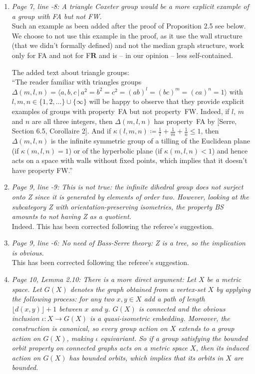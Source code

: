 \documentclass[english,a4paper]{article}
\newcommand*{\FB}{FB\textsubscript{r}}
\newcommand*{\FW}{FW}
\newcommand*{\FA}{FA}
\newcommand*{\FR}{F\textbf{R}}
\begin{document}
\begin{enumerate}
Also added as a discussion after the proof:\\
``In view of Proposition~2.5, two questions remain open: is the implication $[\textnormal{Bergman's property}\implies\textnormal{\FB}]$ strict, and does property~\FW{} implies property~\FR?''
%
\item\textit{Page 7, line -8: A triangle Coxeter group would be a more explicit example of a group with FA but not FW.}\\
Such an example as been added after the proof of Proposition 2.5 see below. We choose to not use this example in the proof, as it use the wall structure (that we didn't formally defined) and not the median graph structure, work only for FA and not for F$\mathbf{R}$ and is -- in our opinion -- less self-contained.

The added text about triangle groups:\\
``The reader familiar with triangles groups $\Delta(m,l,n)=\langle a,b,c\,|\,a^2=b^2=c^2=(ab)^l=(bc)^m=(ca)^n=1\rangle$ with $l,m,n\in\{1,2,\dots\}\cup\{\infty\}$ will be happy to observe that they provide explicit examples of groups with property~\FA{} but not property~\FW.
Indeed, if $l$, $m$ and $n$ are all three integers, then $\Delta(m,l,n)$ has property~\FA{} by [Serre, Section 6.5, Corollaire 2].
And if $\kappa(l,m,n)\coloneqq\frac1l+\frac1m+\frac1n\leq 1$, then $\Delta(m,l,n)$ is the infinite symmetric group of a tilling of the Euclidean plane (if $\kappa(m,l,n)=1$) or of the hyperbolic plane (if $\kappa(m,l,n)<1$) and hence acts on a space with walls without fixed points, which implies that it doesn't have property FW.''
%
\setcounter{enumi}{11}
\item\textit{Page 9, line -9: This is not true: the infinite dihedral group does not surject onto Z since it is generated by elements of order two. However, looking at the subcategory {Z} with orientation-preserving isometries, the property BS amounts to not having Z as a quotient.}\\
Indeed. This has been corrected following the referee's suggestion.
%
\item\textit{Page 9, line -6: No need of Bass-Serre theory: Z is a tree, so the implication is obvious.}\\
This has been corrected following the referee's suggestion.
%
\item\textit{Page 10, Lemma 2.10: There is a more direct argument: Let $X$ be a metric space. Let $G(X)$ denotes the graph obtained from a vertex-set $X$ by applying the following process: for any two $x, y\in X$ add a path of length $\lfloor d(x, y)\rfloor + 1$ between $x$ and $y$. $G(X)$ is connected and the obvious inclusion $\iota\colon X\to G(X)$ is a quasi-isometric embedding. Moreover, the construction is canonical, so every group action on $X$ extends to a group action on $G(X)$, making $\iota$ equivariant. So if a group satisfying the bounded orbit property on connected graphs acts on a metric space $X$, then its induced action on $G(X)$ has bounded orbits, which implies that its orbits in $X$ are bounded.}\\

\end{enumerate}
\end{document}
